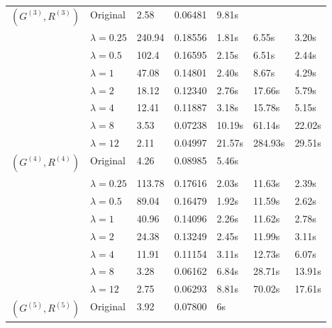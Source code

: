 \documentclass[11pt,a4paper,openright,oneside]{book}
\numberwithin{equation}{section}
\begin{document}
{\begin{figure}[h]
\begin{adjustwidth}{-30pt}{-30pt}
\begin{tabular}{lllllll}
$(G^{(3)}, R^{(3)})$ & Original         & 2.58   & 0.06481    & 9.81s  &                   &                    \\
                     & $\lambda = 0.25$ & 240.94 & 0.18556    & 1.81s  & 6.55s             & 3.20s              \\
                     & $\lambda = 0.5$  & 102.4  & 0.16595    & 2.15s  & 6.51s             & 2.44s              \\
                     & $\lambda = 1$    & 47.08  & 0.14801    & 2.40s  & 8.67s             & 4.29s              \\
                     & $\lambda = 2$    & 18.12  & 0.12340    & 2.76s  & 17.66s            & 5.79s              \\
                     & $\lambda = 4$    & 12.41  & 0.11887    & 3.18s  & 15.78s            & 5.15s              \\
                     & $\lambda = 8$    & 3.53   & 0.07238    & 10.19s & 61.14s            & 22.02s             \\
                     & $\lambda = 12$   & 2.11   & 0.04997    & 21.57s & 284.93s           & 29.51s             \\ \hline
$(G^{(4)}, R^{(4)})$ & Original         & 4.26   & 0.08985    & 5.46s  &                   &                    \\
                     & $\lambda = 0.25$ & 113.78 & 0.17616    & 2.03s  & 11.63s            & 2.39s              \\
                     & $\lambda = 0.5$  & 89.04  & 0.16479    & 1.92s  & 11.59s            & 2.62s              \\
                     & $\lambda = 1$    & 40.96  & 0.14096    & 2.26s  & 11.62s            & 2.78s              \\
                     & $\lambda = 2$    & 24.38  & 0.13249    & 2.45s  & 11.99s            & 3.11s              \\
                     & $\lambda = 4$    & 11.91  & 0.11154    & 3.11s  & 12.73s            & 6.07s              \\
                     & $\lambda = 8$    & 3.28   & 0.06162    & 6.84s  & 28.71s            & 13.91s             \\
                     & $\lambda = 12$   & 2.75   & 0.06293    & 8.81s  & 70.02s            & 17.61s             \\ \hline
$(G^{(5)}, R^{(5)})$ & Original         & 3.92   & 0.07800    & 6s     &                   &                    \\

\end{tabular}
\end{adjustwidth}
\end{figure}}
\end{document}
